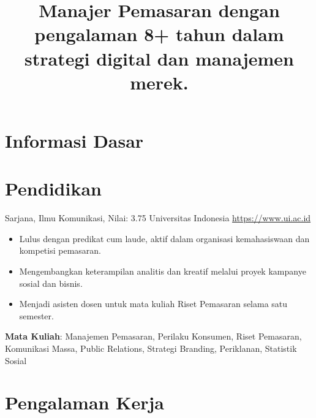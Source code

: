 \documentclass[a4paper, serif, 10pt]{moderncv}
\title{Manajer Pemasaran dengan pengalaman 8+ tahun dalam strategi digital dan manajemen merek.}
\begin{document}
\maketitle

\section{Informasi Dasar}

\section{Pendidikan}

        {Sarjana, Ilmu Komunikasi, Nilai: 3.75}
        {Universitas Indonesia}
        {\url{https://www.ui.ac.id}}
        {}
        {\begin{itemize}
\item Lulus dengan predikat cum laude, aktif dalam organisasi kemahasiswaan dan kompetisi pemasaran.
\item Mengembangkan keterampilan analitis dan kreatif melalui proyek kampanye sosial dan bisnis.
\item Menjadi asisten dosen untuk mata kuliah Riset Pemasaran selama satu semester.
\end{itemize}
\textbf{Mata Kuliah}: Manajemen Pemasaran, Perilaku Konsumen, Riset Pemasaran, Komunikasi Massa, Public Relations, Strategi Branding, Periklanan, Statistik Sosial}
\section{Pengalaman Kerja}
\end{document}
